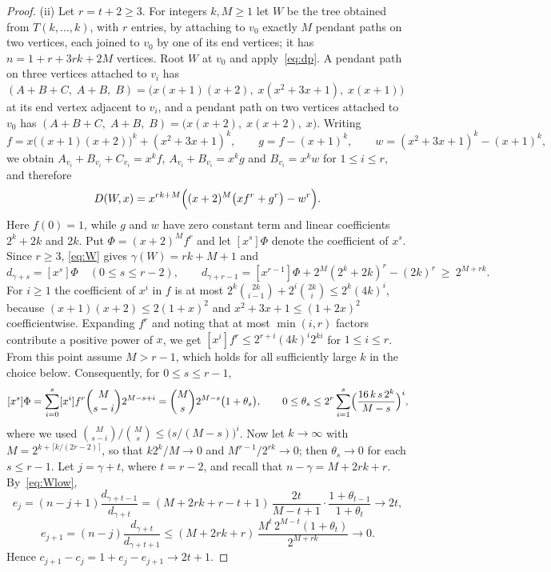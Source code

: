 \documentclass[smallextended,envcountsect,envcountsame]{svjour3}
\begin{document}
\begin{proof}
(ii) Let $r=t+2\ge3$. For integers $k,M\ge1$ let $W$ be the tree obtained from
$T(k,\dots,k)$, with $r$ entries, by attaching to $v_0$ exactly $M$ pendant
paths on two vertices, each joined to $v_0$ by one of its end vertices; it
has $n=1+r+3rk+2M$ vertices. Root $W$ at $v_0$ and
apply~\eqref{eq:dp}. A pendant path on three vertices attached to
$v_i$ has $(A+B+C,\;A+B,\;B)=\bigl(x(x+1)(x+2),\;x(x^2+3x+1),\;x(x+1)\bigr)$
at its end vertex adjacent to $v_i$, and a pendant path on two vertices
attached to $v_0$ has $(A+B+C,\;A+B,\;B)=\bigl(x(x+2),\;x(x+2),\;x\bigr)$.
Writing
\begingroup\small\[
  f=x\bigl((x+1)(x+2)\bigr)^k+(x^2+3x+1)^k,\qquad g=f-(x+1)^k,\qquad
  w=(x^2+3x+1)^k-(x+1)^k ,
\]\endgroup
we obtain $A_{v_i}+B_{v_i}+C_{v_i}=x^kf$, $A_{v_i}+B_{v_i}=x^kg$ and
$B_{v_i}=x^kw$ for $1\le i\le r$, and therefore
\begingroup\small\begin{equation}\label{eq:W}
  D(W,x)=x^{rk+M}\Bigl((x+2)^M\bigl(xf^r+g^r\bigr)-w^r\Bigr).
\end{equation}\endgroup
Here $f(0)=1$, while $g$ and $w$ have zero constant term and linear
coefficients $2^k+2k$ and $2k$. Put $\Phi=(x+2)^Mf^r$ and let $[x^s]\Phi$
denote the coefficient of $x^s$. Since $r\ge3$, \eqref{eq:W} gives
$\gamma(W)=rk+M+1$ and
\begingroup\small\begin{equation}\label{eq:Wlow}
  d_{\gamma+s}=[x^s]\Phi\quad(0\le s\le r-2),\qquad
  d_{\gamma+r-1}=[x^{r-1}]\Phi+2^M(2^k+2k)^r-(2k)^r\ \ge\ 2^{M+rk}.
\end{equation}\endgroup
For $i\ge1$ the coefficient of $x^i$ in $f$ is at most
$2^k\binom{2k}{i-1}+2^i\binom{2k}{i}\le2^k(4k)^i$, because
$(x+1)(x+2)\le2(1+x)^2$ and $x^2+3x+1\le(1+2x)^2$ coefficientwise. Expanding
$f^r$ and noting that at most $\min(i,r)$ factors contribute a positive power
of $x$, we get $[x^i]f^r\le2^{r+i}(4k)^i2^{ki}$ for $1\le i\le r$. From this point assume $M>r-1$, which holds for all sufficiently large $k$
in the choice below. Consequently, for $0\le s\le r-1$,
\begingroup\small\[
  [x^s]\Phi=\sum_{i=0}^{s}[x^i]f^r\binom{M}{s-i}2^{M-s+i}
  =\binom Ms2^{M-s}\bigl(1+\theta_s\bigr),\qquad
  0\le\theta_s\le2^r\sum_{i=1}^{s}\Bigl(\frac{16\,k\,s\,2^k}{M-s}\Bigr)^{i},
\]\endgroup
where we used $\binom{M}{s-i}\big/\binom Ms\le\bigl(s/(M-s)\bigr)^i$. Now let
$k\to\infty$ with $M=2^{k+\lceil k/(2r-2)\rceil}$, so that $k2^k/M\to0$ and
$M^{r-1}/2^{rk}\to0$; then $\theta_s\to0$ for each $s\le r-1$. Let $j=\gamma+t$,
where $t=r-2$, and recall that $n-\gamma=M+2rk+r$. By~\eqref{eq:Wlow},
\begingroup\small\[
  e_j=(n-j+1)\frac{d_{\gamma+t-1}}{d_{\gamma+t}}
     =(M+2rk+r-t+1)\,\frac{2t}{M-t+1}\cdot\frac{1+\theta_{t-1}}{1+\theta_t}
     \longrightarrow2t ,
\]\endgroup
\begingroup\small\[
  e_{j+1}=(n-j)\frac{d_{\gamma+t}}{d_{\gamma+t+1}}
     \le(M+2rk+r)\,\frac{M^{t}\,2^{M-t}(1+\theta_t)}{2^{M+rk}}
     \longrightarrow0 .
\]\endgroup
Hence $c_{j+1}-c_j=1+e_j-e_{j+1}\to2t+1$.
\end{proof}
\end{document}
